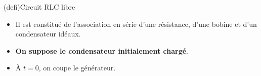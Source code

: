 \documentclass[../../main/main.tex]{subfiles}
\begin{document}
\begin{tcb*}[sidebyside, righthand ratio=.30](defi){Circuit RLC libre}
	\begin{itemize}
		\item Il est constitué de l'association en série d'une résistance, d'une
		      bobine et d'un condensateur idéaux.
		\item \textbf{On suppose le condensateur initialement chargé}.
		\item À $t=0$, on coupe le générateur.
	\end{itemize}
	\tcblower
	\begin{center}
	\end{center}
\end{tcb*}
\end{document}
